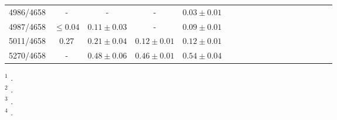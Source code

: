\documentclass{emulateapj}
\begin{document}
\begin{table*}
{\begin{minipage}{10cm}
\begin{tabular}{lccccccccccccccccc}
4986/4658			&-			&-					&-				&$0.03 \pm 0.01$	        	\\
                                                                                                                                                         
4987/4658			& $\leq$0.04		&$0.11 \pm 0.03$			&-				&$0.09 \pm 0.01$	 		\\
                                                                                                                                                         
5011/4658			&0.27			&$0.21 \pm 0.04$			&$0.12 \pm 0.01$		&$0.12 \pm 0.01$	        	\\
                                                                                                                                                         
5270/4658			&-			&$0.48 \pm 0.06$			&$0.46 \pm 0.01$		&$0.54 \pm 0.04$	        	\\


\hline \hline
\end{tabular} 
\end{minipage}%



\begin{minipage}{8cm}
\begin{flushleft}
{$^1$ \citet{2003A&A...401.1119R}. } \\
{$^2$ \citet{2009MNRAS.395..855M}. } \\
{$^3$ \citet{2000ApJS..129..229B}. } \\
{$^4$ \citet{1998MNRAS.295..401E}. } \\
\end{flushleft}
\end{minipage}%




}
\end{table*}


\end{document}
